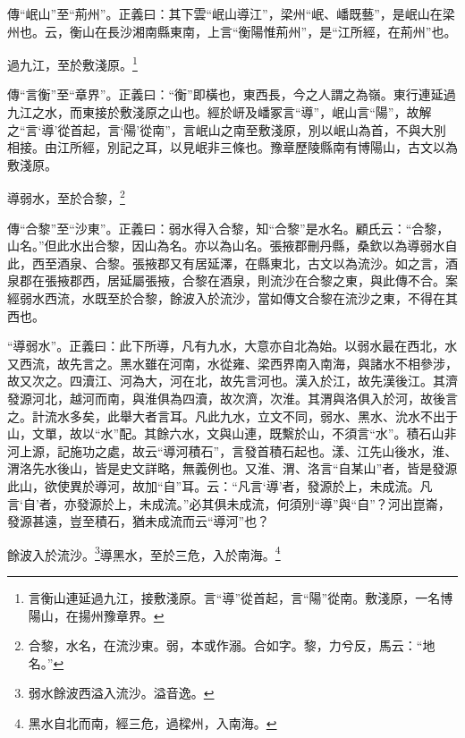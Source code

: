 {\noindent\zhuan{}\fzbyks 傳“岷山”至“荊州”。正義曰：其下雲“岷山導江”，梁州“岷、嶓既藝”，是岷山在梁州也。云，衡山在長沙湘南縣東南，上言“衡陽惟荊州”，是“江所經，在荊州”也。 \par}

過九江，至於敷淺原。\footnote{言衡山連延過九江，接敷淺原。言“導”從首起，言“陽”從南。敷淺原，一名博陽山，在揚州豫章界。}

{\noindent\zhuan{}\fzbyks 傳“言衡”至“章界”。正義曰：“衡”即橫也，東西長，今之人謂之為嶺。東行連延過九江之水，而東接於敷淺原之山也。經於岍及嶓冢言“導”，岷山言“陽”，故解之“言‘導’從首起，言‘陽’從南”，言岷山之南至敷淺原，別以岷山為首，不與大別相接。由江所經，別記之耳，以見岷非三條也。豫章歷陵縣南有博陽山，古文以為敷淺原。 \par}

導弱水，至於合黎，\footnote{合黎，水名，在流沙東。弱，本或作溺。合如字。黎，力兮反，馬云：“地名。”}

{\noindent\zhuan{}\fzbyks 傳“合黎”至“沙東”。正義曰：弱水得入合黎，知“合黎”是水名。顧氏云：“合黎，山名。”但此水出合黎，因山為名。亦以為山名。張掖郡刪丹縣，桑欽以為導弱水自此，西至酒泉、合黎。張掖郡又有居延澤，在縣東北，古文以為流沙。如之言，酒泉郡在張掖郡西，居延屬張掖，合黎在酒泉，則流沙在合黎之東，與此傳不合。案經弱水西流，水既至於合黎，餘波入於流沙，當如傳文合黎在流沙之東，不得在其西也。 \par}

{\noindent\shu{}\fzkt “導弱水”。正義曰：此下所導，凡有九水，大意亦自北為始。以弱水最在西北，水又西流，故先言之。黑水雖在河南，水從雍、梁西界南入南海，與諸水不相參涉，故又次之。四瀆江、河為大，河在北，故先言河也。漢入於江，故先漢後江。其濟發源河北，越河而南，與淮俱為四瀆，故次濟，次淮。其渭與洛俱入於河，故後言之。計流水多矣，此舉大者言耳。凡此九水，立文不同，弱水、黑水、沇水不出于山，文單，故以“水”配。其餘六水，文與山連，既繫於山，不須言“水”。積石山非河上源，記施功之處，故云“導河積石”，言發首積石起也。漾、江先山後水，淮、渭洛先水後山，皆是史文詳略，無義例也。又淮、渭、洛言“自某山”者，皆是發源此山，欲使異於導河，故加“自”耳。云：“凡言‘導’者，發源於上，未成流。凡言‘自’者，亦發源於上，未成流。”必其俱未成流，何須別“導”與“自”？河出崑崙，發源甚遠，豈至積石，猶未成流而云“導河”也？ \par}

餘波入於流沙。\footnote{弱水餘波西溢入流沙。溢音逸。}導黑水，至於三危，入於南海。\footnote{黑水自北而南，經三危，過樑州，入南海。}

